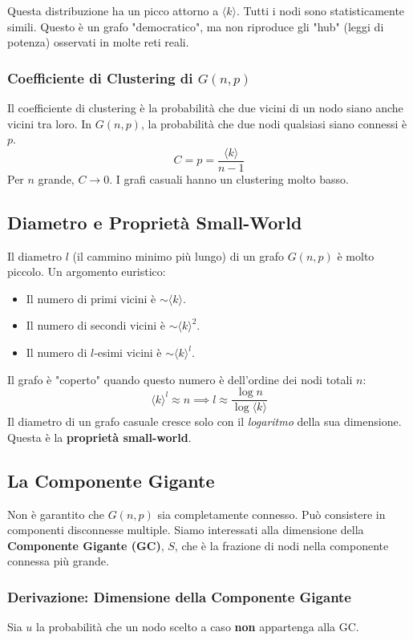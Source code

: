 Questa distribuzione ha un picco attorno a $\langle k \rangle$. Tutti i nodi sono statisticamente simili. Questo è un grafo "democratico", ma non riproduce gli "hub" (leggi di potenza) osservati in molte reti reali.

\subsubsection{Coefficiente di Clustering di $G(n,p)$}
Il coefficiente di clustering è la probabilità che due vicini di un nodo siano anche vicini tra loro. In $G(n,p)$, la probabilità che due nodi qualsiasi siano connessi è $p$.
\begin{equation}
 C = p = \frac{\langle k \rangle}{n-1}
\end{equation}
Per $n$ grande, $C \to 0$. I grafi casuali hanno un clustering molto basso.

\subsection{Diametro e Proprietà Small-World}
Il diametro $l$ (il cammino minimo più lungo) di un grafo $G(n,p)$ è molto piccolo.
Un argomento euristico:
\begin{itemize}
\item Il numero di primi vicini è $\sim \langle k \rangle$.
\item Il numero di secondi vicini è $\sim \langle k \rangle^2$.
\item Il numero di $l$-esimi vicini è $\sim \langle k \rangle^l$.
\end{itemize}
Il grafo è "coperto" quando questo numero è dell'ordine dei nodi totali $n$:
\begin{equation}
 \langle k \rangle^l \approx n \implies l \approx \frac{\log n}{\log \langle k \rangle}
\end{equation}
Il diametro di un grafo casuale cresce solo con il \textit{logaritmo} della sua dimensione. Questa è la \textbf{proprietà small-world}.

\subsection{La Componente Gigante}
Non è garantito che $G(n,p)$ sia completamente connesso. Può consistere in componenti disconnesse multiple. Siamo interessati alla dimensione della \textbf{Componente Gigante (GC)}, $S$, che è la frazione di nodi nella componente connessa più grande.

\subsubsection{Derivazione: Dimensione della Componente Gigante}
Sia $u$ la probabilità che un nodo scelto a caso \textbf{non} appartenga alla GC.

